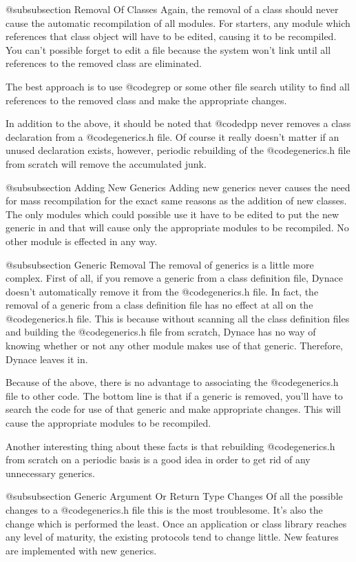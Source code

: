 @subsubsection Removal Of Classes
Again, the removal of a class should never cause the automatic
recompilation of all modules.  For starters, any module which
references that class object will have to be edited, causing it to
be recompiled.  You can't possible forget to edit a file because
the system won't link until all references to the removed class
are eliminated.

The best approach is to use @code{grep} or some other file search utility
to find all references to the removed class and make the appropriate
changes.

In addition to the above, it should be noted that @code{dpp} never
removes a class declaration from a @code{generics.h} file.  Of
course it really doesn't matter if an unused declaration exists,
however, periodic rebuilding of the @code{generics.h} file
from scratch will remove the accumulated junk.

@subsubsection Adding New Generics
Adding new generics never causes the need for mass recompilation for the
exact same reasons as the addition of new classes.  The only modules
which could possible use it have to be edited to put the new generic in
and that will cause only the appropriate modules to be recompiled.
No other module is effected in any way.

@subsubsection Generic Removal
The removal of generics is a little more complex.  First of all,
if you remove a generic from a class definition file, Dynace
doesn't automatically remove it from the @code{generics.h} file.
In fact, the removal of a generic from a class definition file
has no effect at all on the @code{generics.h} file.  This is because
without scanning all the class definition files and building the
@code{generics.h} file from scratch, Dynace has no way of knowing
whether or not any other module makes use of that generic.
Therefore, Dynace leaves it in.

Because of the above, there is no advantage to associating the
@code{generics.h} file to other code.  The bottom line is that
if a generic is removed, you'll have to search the code for
use of that generic and make appropriate changes.  This will
cause the appropriate modules to be recompiled.

Another interesting thing about these facts is that rebuilding
@code{generics.h} from scratch on a periodic basis is a good idea in
order to get rid of any unnecessary generics.

@subsubsection Generic Argument Or Return Type Changes
Of all the possible changes to a @code{generics.h} file this is the
most troublesome.  It's also the change which is performed
the least.  Once an application or class library reaches any level
of maturity, the existing protocols tend to change little.  New
features are implemented with new generics.

